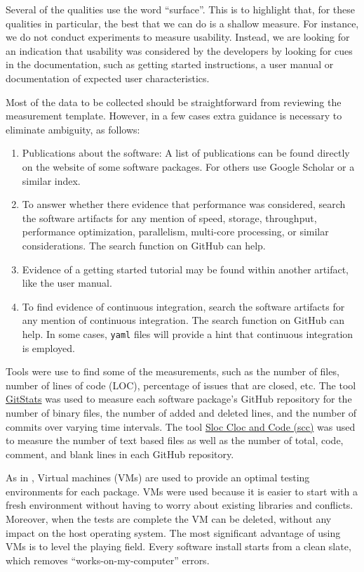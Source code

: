 \documentclass[runningheads]{llncs}
\begin{document}
Several of the qualities use the word ``surface''.  This is to highlight that,
for these qualities in particular, the best that we can do is a shallow measure.
For instance, we do not conduct experiments to measure usability. Instead, we
are looking for an indication that usability was considered by the developers by
looking for cues in the documentation, such as getting started instructions, a
user manual or documentation of expected user characteristics.

Most of the data to be collected should be straightforward from reviewing the
measurement template.  However, in a few cases extra guidance is necessary
to eliminate ambiguity, as follows:

\begin{enumerate}
\item Publications about the software: A list of publications can be found
  directly on the website of some software packages. For others use Google
  Scholar or a similar index.
\item To answer whether there evidence that performance was considered, search
  the software artifacts for any mention of speed, storage, throughput,
  performance optimization, parallelism, multi-core processing, or similar
  considerations. The search function on GitHub can help.
\item Evidence of a getting started tutorial may be found within another
  artifact, like the user manual.
\item To find evidence of continuous integration, search the software artifacts
  for any mention of continuous integration. The search function on GitHub can
  help.  In some cases, \texttt{yaml} files will provide a hint that continuous
  integration is employed.
\end{enumerate}

Tools were use to find some of the measurements, such as the number of files,
number of lines of code (LOC), percentage of issues that are closed, etc. The
tool \href{https://github.com/tomgi/git_stats}{GitStats} was used to measure
each software package's GitHub repository for the number of binary files, the
number of added and deleted lines, and the number of commits over varying time
intervals. The tool \href{https://github.com/boyter/scc}{Sloc Cloc and Code
(scc)} was used to measure the number of text based files as well as the number
of total, code, comment, and blank lines in each GitHub repository.

As in \cite{SmithEtAl2016}, Virtual machines (VMs) are used to provide an
optimal testing environments for each package. VMs were used because it is
easier to start with a fresh environment without having to worry about existing
libraries and conflicts. Moreover, when the tests are complete the VM can be
deleted, without any impact on the host operating system. The most significant
advantage of using VMs is to level the playing field. Every software install
starts from a clean slate, which removes ``works-on-my-computer'' errors.
\end{document}
